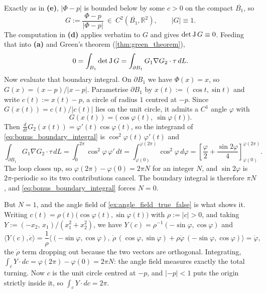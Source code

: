 \begin{exercisesolution}
\begin{enumerate}[label=\textbf{(\alph*)}]
    Exactly as in \textbf{(e)}, $\lvert\Phi - p\rvert$ is bounded below by some $c > 0$ on the
    compact $\overline{B_1}$, so
    \[G := \frac{\Phi - p}{\lvert\Phi - p\rvert} \ \in\ C^2(\overline{B_1},\mathbb{R}^2),
      \qquad \lvert G\rvert \equiv 1 .\]
    The computation in \textbf{(d)} applies verbatim to $G$ and gives $\det\operatorname{J} G \equiv 0$.
    Feeding that into \textbf{(a)} and Green's theorem (\cref{thm:green_theorem}),
    \begin{equation}
    \label{eq:bonus_boundary_integral}
      0 = \int_{B_1}\det\operatorname{J} G = \int_{\partial B_1} G_1\nabla G_2 \cdot \tau\,dL .
    \end{equation}
    Now evaluate that boundary integral. On $\partial B_1$ we have $\Phi(x) = x$, so
    $G(x) = (x-p)/\lvert x-p\rvert$. Parametrise $\partial B_1$ by $x(t) := (\cos t, \sin t)$ and
    write $c(t) := x(t) - p$, a circle of radius $1$ centred at $-p$. Since $G(x(t)) = c(t)/\lvert
    c(t)\rvert$ lies on the unit circle, it admits a $C^1$ angle $\varphi$ with
    \[G(x(t)) = \big(\cos\varphi(t),\ \sin\varphi(t)\big).\]
    Then $\tfrac{d}{dt}G_2(x(t)) = \varphi'(t)\cos\varphi(t)$, so the integrand of
    \eqref{eq:bonus_boundary_integral} is $\cos^2\varphi(t)\,\varphi'(t)$ and
    \[\int_{\partial B_1} G_1\nabla G_2\cdot\tau\,dL
      = \int_0^{2\pi}\cos^2\varphi\,\varphi'\,dt
      = \int_{\varphi(0)}^{\varphi(2\pi)}\cos^2\varphi\,d\varphi
      = \left[\frac{\varphi}{2} + \frac{\sin 2\varphi}{4}\right]_{\varphi(0)}^{\varphi(2\pi)} .\]
    The loop closes up, so $\varphi(2\pi) - \varphi(0) = 2\pi N$ for an integer $N$, and
    $\sin 2\varphi$ is $2\pi$-periodic so its two contributions cancel. The boundary integral is
    therefore $\pi N$, and \eqref{eq:bonus_boundary_integral} forces $N = 0$.

    But $N = 1$, and the angle field of \cref{ex:angle_field_true_false} is what shows it. Writing
    $c(t) = \rho(t)\big(\cos\varphi(t), \sin\varphi(t)\big)$ with $\rho := \lvert c\rvert > 0$, and
    taking $Y := (-x_2,\,x_1)/(x_1^2+x_2^2)$, we have $Y(c) = \rho^{-1}(-\sin\varphi,\cos\varphi)$
    and
    \[\langle Y(c),\dot c\rangle
      = \frac{1}{\rho}\Big\langle(-\sin\varphi,\cos\varphi),\
        \dot\rho\,(\cos\varphi,\sin\varphi) + \rho\dot\varphi\,(-\sin\varphi,\cos\varphi)\Big\rangle
      = \dot\varphi,\]
    the $\dot\rho$ term dropping out because the two vectors are orthogonal. Integrating,
    $\int_c Y\cdot dc = \varphi(2\pi)-\varphi(0) = 2\pi N$: the angle field measures exactly the
    total turning. Now $c$ is the unit circle centred at $-p$, and $\lvert -p\rvert < 1$ puts the
    origin strictly inside it, so $\int_c Y\cdot dc = 2\pi$.


\end{enumerate}
\end{exercisesolution}
